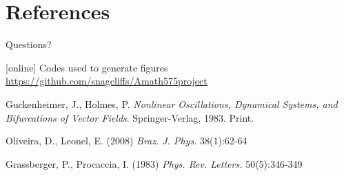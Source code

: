 \documentclass[12pt]{beamer}
\begin{document}
\section*{References}
\begin{frame}{Questions?}
\begin{thebibliography}{10}    
[online]
 Codes used to generate figures
\url{https://github.com/snagcliffs/Amath575project}

\beamertemplatebookbibitems %
 Guckenheimer, J., Holmes, P. \textit{Nonlinear Oscillations, Dynamical Systems, and Bifurcations of Vector Fields}. Springer-Verlag, 1983. Print.

\beamertemplatearticlebibitems %
  Oliveira, D., Leonel, E. (2008) \textit{Braz. J. Phys.} 38(1):62-64

 Grassberger, P., Procaccia, I. (1983) \textit{Phys. Rev. Letters.} 50(5):346-349

\end{thebibliography}
\end{frame}
\end{document}
